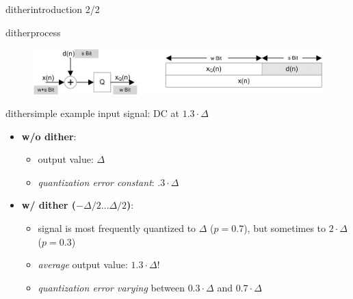 	\begin{frame}{dither}{introduction 2/2}
		\vspace{-5mm}
	\end{frame}	
	\begin{frame}{dither}{process}
		\begin{figure}
			\centering
				\includegraphics[scale=0.9]{Graph/quantisierung_mit_dither.png}
		\end{figure}
	\end{frame}	
	\begin{frame}{dither}{simple example}
		input signal: DC at $1.3\cdot\Delta$
        \bigskip
		\begin{itemize}
			\item	\textbf{w/o dither}: 
				\begin{itemize}
					\item	output value: $\Delta$
					\item	\textit{quantization error constant}: $.3\cdot\Delta$
				\end{itemize}
			\pause
            \bigskip
			\item	\textbf{w/ dither ($-\Delta/2\ldots\Delta/2$)}: 
				\begin{itemize}
					\item	signal is most frequently quantized to $\Delta$ ($p = 0.7$), but sometimes to $2\cdot\Delta$ ($p=0.3$)
					\bigskip
                    \item<3->	\textit{average} output value: $1.3\cdot\Delta$!
                    \item<3->   \textit{quantization error varying} between $0.3\cdot\Delta$ and $0.7\cdot\Delta$
				\end{itemize}
		\end{itemize}
	\end{frame}	
